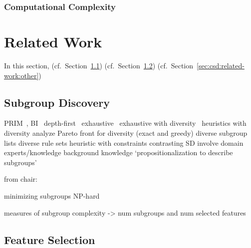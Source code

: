 \documentclass{article}
\theoremstyle{definition}
\begin{document}
\subsubsection{Computational Complexity}
\label{sec:csd:approach:alternatives:complexity}

\section{Related Work}
\label{sec:csd:related-work}

In this section, (cf.~Section~\ref{sec:csd:related-work:subgroup-discovery}) (cf.~Section~\ref{sec:csd:related-work:feature-selection})
(cf.~Section~\ref{sec:csd:related-work:other})

\subsection{Subgroup Discovery}
\label{sec:csd:related-work:subgroup-discovery}

PRIM~\cite{friedman1999bump}, BI~\cite{mampaey2012efficient}
depth-first~\cite{millot2020optimal}
exhaustive~\cite{atzmueller2006sd, atzmueller2009fast, grosskreutz2009subgroup, lemmerich2016fast}
exhaustive with diversity~\cite{bosc2018anytime, lemmerich2010fast}
heuristics with diversity \cite{leeuwen2012diverse, lucas2018ssdp+, proencca2022robust}
analyze Pareto front for diversity (exact and greedy) \cite{leeuwen2013discovering}
diverse subgroup lists \cite{lopez2023discovering, lopez2023novel}
diverse rule sets \cite{zhang2020diverse}
heuristic with constraints \cite{lavravc2006relevancy}
contrasting SD \cite{langohr2013contrasting}
involve domain experts/knowledge \cite{dzyuba2013interactive, gamberger2002expert, lemmerich2011local}
background knowledge \cite{atzmueller2005exploiting, atzmueller2006methodological}
`propositionalization to describe subgroups' \cite{zelezny2006propositionalization}

from chair: \cite{arzamasov2021reds} \cite{arzamasov2022pedagogical} \cite{vollmer2019informative}

minimizing subgroups NP-hard~\cite{boley2009non}

measures of subgroup complexity \cite{helal2016subgroup, herrera2011overview, ventura2018subgroup} -> num subgroups and num selected features

\subsection{Feature Selection}
\label{sec:csd:related-work:feature-selection}
\end{document}
